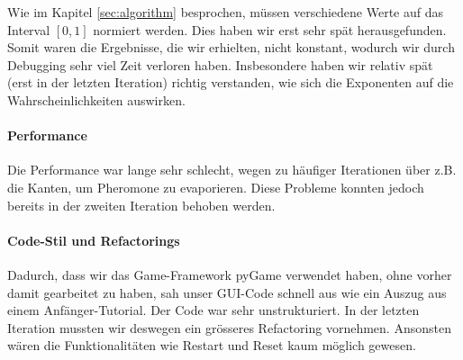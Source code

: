 Wie im Kapitel \ref{sec:algorithm} besprochen, müssen verschiedene Werte auf das
Interval $[0,1]$ normiert werden. Dies haben wir erst sehr spät herausgefunden.
Somit waren die Ergebnisse, die wir erhielten, nicht konstant, wodurch wir durch
Debugging sehr viel Zeit verloren haben. Insbesondere haben wir relativ spät
(erst in der letzten Iteration) richtig verstanden, wie sich die Exponenten auf
die Wahrscheinlichkeiten auswirken.

\paragraph*{Performance}

Die Performance war lange sehr schlecht, wegen zu häufiger Iterationen über z.B.
die Kanten, um Pheromone zu evaporieren. Diese Probleme konnten jedoch bereits
in der zweiten Iteration behoben werden.

\paragraph*{Code-Stil und Refactorings}

Dadurch, dass wir das Game-Framework pyGame verwendet haben, ohne vorher damit
gearbeitet zu haben, sah unser GUI-Code schnell aus wie ein Auszug aus einem
Anfänger-Tutorial. Der Code war sehr unstrukturiert. In der letzten Iteration
mussten wir deswegen ein grösseres Refactoring vornehmen. Ansonsten wären die
Funktionalitäten wie Restart und Reset kaum möglich gewesen.


